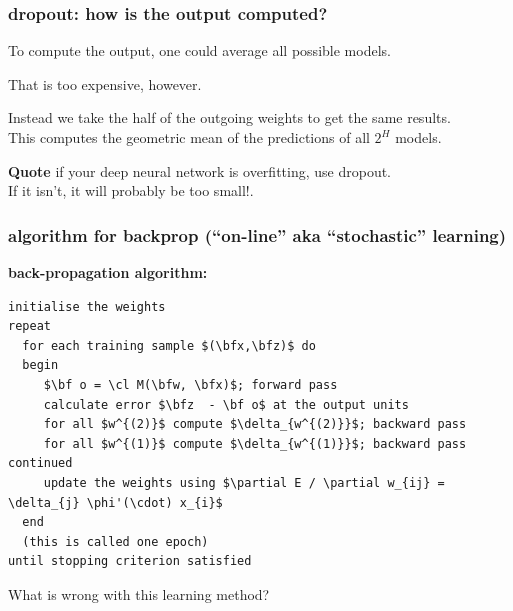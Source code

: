 \documentclass[USenglish,pdftex,compress,10pt,svgnamesi,handout]{beamer}
\newcommand{\bfw}{\Vec{w}}
\newcommand{\bfx}{\Vec{x}}
\newcommand{\bfz}{\Vec{z}}
\def\bf#1{\Vec{#1}}
\def\cl#1{{\cal #1}}
\begin{document}
\begin{frame}
\frametitle{dropout: how is the output computed?}
To compute the output, one could average all possible models.

That is too expensive, however.  

Instead we take the half of the outgoing weights to get the same results.\\
This  computes the geometric mean of the predictions of all $2^H$ models.

\vfill

\begin{beamerboxesrounded}[scheme=proof,width=0.95\textwidth,shadow=true]{\textbf{Quote}}
	if your deep neural network is overfitting, use dropout. \\ If it isn't, it will probably be too small!.
\end{beamerboxesrounded}

\end{frame}





\begin{frame}[fragile]
\frametitle{algorithm for backprop (``on-line'' aka ``stochastic'' learning)}

\begin{beamerboxesrounded}[upper=def,lower=block body,width=1.03\textwidth,shadow]{\textbf{back-propagation algorithm:}}
\begin{lstlisting}[mathescape]
initialise the weights
repeat
  for each training sample $(\bfx,\bfz)$ do
  begin
     $\bf o = \cl M(\bfw, \bfx)$; forward pass
     calculate error $\bfz  - \bf o$ at the output units
     for all $w^{(2)}$ compute $\delta_{w^{(2)}}$; backward pass
     for all $w^{(1)}$ compute $\delta_{w^{(1)}}$; backward pass continued
     update the weights using $\partial E / \partial w_{ij} = \delta_{j} \phi'(\cdot) x_{i}$
  end
  (this is called one epoch)
until stopping criterion satisfied
\end{lstlisting}
\end{beamerboxesrounded}
What is wrong with this learning method?

\end{frame}
\end{document}
